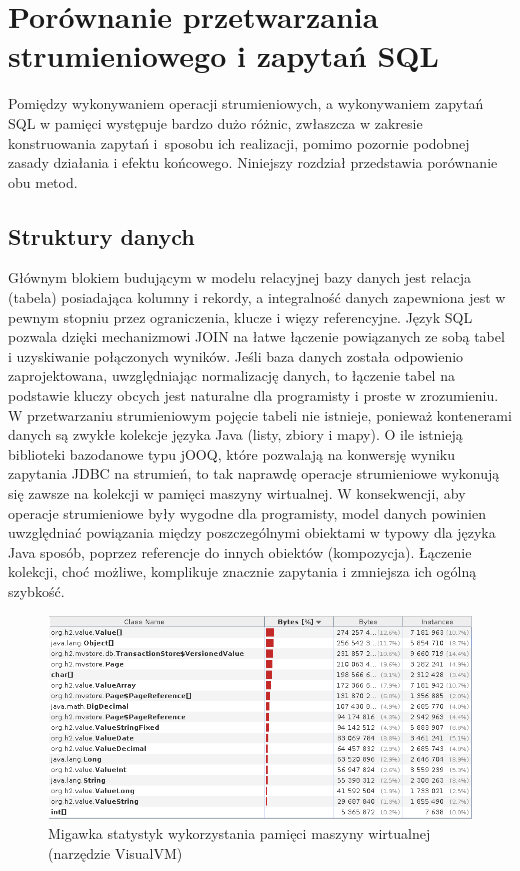 \documentclass[12pt,twoside,openright]{extarticle}
\begin{document}
\cleardoublepage
\section{Porównanie przetwarzania strumieniowego i zapytań SQL}

    Pomiędzy wykonywaniem operacji strumieniowych, a wykonywaniem zapytań SQL w pamięci występuje bardzo dużo różnic, zwłaszcza w zakresie konstruowania zapytań i~sposobu ich realizacji, pomimo pozornie podobnej zasady działania i efektu końcowego. Niniejszy rozdział przedstawia porównanie obu metod.

\subsection{Struktury danych}

    Głównym blokiem budującym w modelu relacyjnej bazy danych jest relacja (tabela) posiadająca kolumny i rekordy, a integralność danych zapewniona jest w pewnym stopniu przez ograniczenia, klucze i więzy referencyjne. Język SQL pozwala dzięki mechanizmowi JOIN na łatwe łączenie powiązanych ze sobą tabel i uzyskiwanie połączonych wyników. Jeśli baza danych została odpowienio zaprojektowana, uwzględniając normalizację danych, to łączenie tabel na podstawie kluczy obcych jest naturalne dla programisty i proste w zrozumieniu. W przetwarzaniu strumieniowym pojęcie tabeli nie istnieje, ponieważ kontenerami danych są zwykłe kolekcje języka Java (listy, zbiory i mapy). O ile istnieją biblioteki bazodanowe typu jOOQ, które pozwalają na konwersję wyniku zapytania JDBC na strumień, to tak naprawdę operacje strumieniowe wykonują się zawsze na kolekcji w pamięci maszyny wirtualnej. W konsekwencji, aby operacje strumieniowe były wygodne dla programisty, model danych powinien uwzględniać powiązania między poszczególnymi obiektami w typowy dla języka Java sposób, poprzez referencje do innych obiektów (kompozycja). Łączenie kolekcji, choć możliwe, komplikuje znacznie zapytania i zmniejsza ich ogólną szybkość.

\begin{figure}[h]
\centering
\includegraphics[width=15cm]{jvmmemory}
\caption{Migawka statystyk wykorzystania pamięci maszyny wirtualnej (narzędzie VisualVM)}
\label{fig:jvmmemory}
\end{figure}
\end{document}
